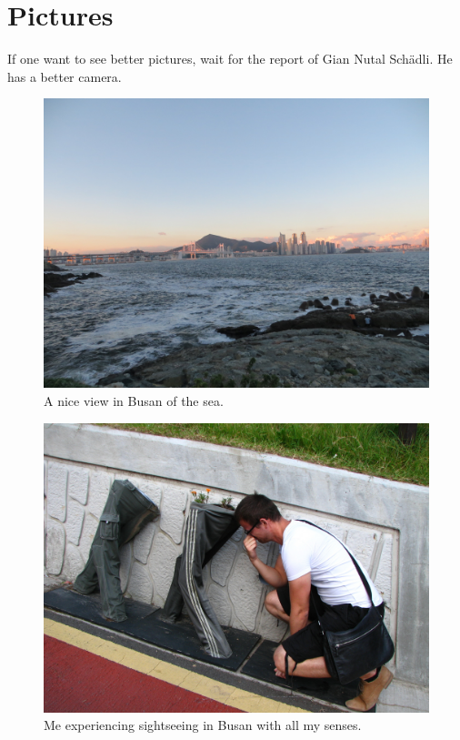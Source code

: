 \section*{Pictures}
If one want to see better pictures, wait for the report of Gian Nutal Schädli. He has a better camera.
\begin{figure}[h]
	\begin{center}
		\includegraphics*[width=\columnwidth]{photo1.jpg}
	\end{center}
	\caption{A nice view in Busan of the sea.}
	\label{fig:photo1}
\end{figure}
\begin{figure}[]
	\begin{center}
		\includegraphics*[width=\columnwidth]{photo3.jpg}
	\end{center}
	\caption{Me experiencing sightseeing in Busan with all my senses.}
	\label{fig:photo1}
\end{figure}
